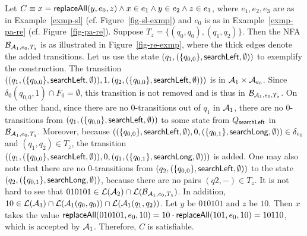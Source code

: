 \begin{example}
Let $C \equiv x = \mathsf{replaceAll}(y, e_0, z) \wedge x \in e_1 \wedge y \in e_2 \wedge z \in e_3$, where $e_1,e_2,e_3$ are as in Example~\ref{exmp-sl} (cf. Figure~\ref{fig-sl-exmp}) and $e_0$ is as in Example~\ref{exmp-pa-re} (cf. Figure~\ref{fig-pa-re}). Suppose $T_z = \{(q_0, q_0), (q_1, q_2)\}$. Then the NFA $\mathcal{B}_{\mathcal{A}_1, e_0, T_z}$ is as illustrated in Figure~\ref{fig-re-exmp}, where the thick edges denote the added transitions. Let us use the state $(q_1, (\{q_{0,0}\}, \mathsf{searchLeft}, \emptyset))$ to exemplify the construction. The transition $((q_1, (\{q_{0,0}\}, \mathsf{searchLeft}, \emptyset)), 1, (q_2, (\{q_{0,0}\}, \mathsf{searchLeft}, \emptyset)))$ is  in $\mathcal{A}_1 \times \mathcal{A}_{e_0}$. Since $\delta_0(q_{0,0}, 1) \cap F_0 = \emptyset$, this transition is not removed and is thus in $\mathcal{B}_{\mathcal{A}_1, e_0, T_z}$. On the other hand, since there are no $0$-transitions out of $q_1$ in $\mathcal{A}_1$, there are no $0$-transitions from $(q_1, (\{q_{0,0}\}, \mathsf{searchLeft}, \emptyset))$ to some state from $Q_{\mathsf{searchLeft}}$ in $\mathcal{B}_{\mathcal{A}_1, e_0, T_z}$. 
Moreover, because $((\{q_{0,0}\}, \mathsf{searchLeft}, \emptyset), 0, (\{q_{0,1}\}, \mathsf{searchLong}, \emptyset)) \in \delta_{e_0}$ and $(q_1, q_2) \in T_z$, the transition $((q_1, (\{q_{0,0}\}, \mathsf{searchLeft}, \emptyset)), 0, (q_1, (\{q_{0,1}\}, \mathsf{searchLong}, \emptyset)))$ is added. 
One may also note that there are no 0-transitions from $(q_2, (\{q_{0,0}\}, \mathsf{searchLeft}, \emptyset))$ to the state $(q_2, (\{q_{0,1}\}, \mathsf{searchLong}, \emptyset))$, because there are no pairs $(q2,-) \in T_z$.
It is not hard to see that $010101 \in \mathcal{L}(\mathcal{A}_2) \cap \mathcal{L}(\mathcal{B}_{\mathcal{A}_1, e_0, T_z})$. In addition, $10 \in \mathcal{L}(\mathcal{A}_3) \cap \mathcal{L}(\mathcal{A}_1(q_0,q_0)) \cap \mathcal{L}(\mathcal{A}_1(q_1,q_2))$. Let $y$ be $010101$ and $z$ be $10$. Then $x$ takes the value $\mathsf{replaceAll}(010101, e_0, 10)=10 \cdot \mathsf{replaceAll}(101, e_0, 10)=10110$, which is accepted by $\mathcal{A}_1$. Therefore, $C$ is satisfiable.
\begin{figure}[htbp]
\begin{center}

\end{center}
\end{figure}
\end{example}

